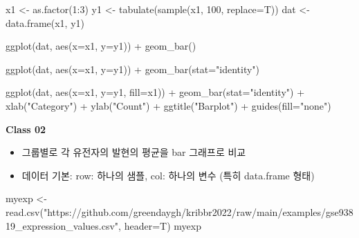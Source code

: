 \documentclass[
]{book}
\newenvironment{Shaded}{\begin{snugshade}}{\end{snugshade}}
\newcommand{\AttributeTok}[1]{\textcolor[rgb]{0.77,0.63,0.00}{#1}}
\newcommand{\DecValTok}[1]{\textcolor[rgb]{0.00,0.00,0.81}{#1}}
\newcommand{\FunctionTok}[1]{\textcolor[rgb]{0.00,0.00,0.00}{#1}}
\newcommand{\NormalTok}[1]{#1}
\newcommand{\OtherTok}[1]{\textcolor[rgb]{0.56,0.35,0.01}{#1}}
\newcommand{\SpecialCharTok}[1]{\textcolor[rgb]{0.00,0.00,0.00}{#1}}
\newcommand{\StringTok}[1]{\textcolor[rgb]{0.31,0.60,0.02}{#1}}
\providecommand{\tightlist}{%
  \setlength{\itemsep}{0pt}\setlength{\parskip}{0pt}}
\begin{document}
\begin{Shaded}
\begin{Highlighting}[]
\NormalTok{x1 }\OtherTok{\textless{}{-}} \FunctionTok{as.factor}\NormalTok{(}\DecValTok{1}\SpecialCharTok{:}\DecValTok{3}\NormalTok{)}
\NormalTok{y1 }\OtherTok{\textless{}{-}} \FunctionTok{tabulate}\NormalTok{(}\FunctionTok{sample}\NormalTok{(x1, }\DecValTok{100}\NormalTok{, }\AttributeTok{replace=}\NormalTok{T))}
\NormalTok{dat }\OtherTok{\textless{}{-}} \FunctionTok{data.frame}\NormalTok{(x1, y1)}

\FunctionTok{ggplot}\NormalTok{(dat, }\FunctionTok{aes}\NormalTok{(}\AttributeTok{x=}\NormalTok{x1, }\AttributeTok{y=}\NormalTok{y1)) }\SpecialCharTok{+}
  \FunctionTok{geom\_bar}\NormalTok{()}

\FunctionTok{ggplot}\NormalTok{(dat, }\FunctionTok{aes}\NormalTok{(}\AttributeTok{x=}\NormalTok{x1, }\AttributeTok{y=}\NormalTok{y1)) }\SpecialCharTok{+}
  \FunctionTok{geom\_bar}\NormalTok{(}\AttributeTok{stat=}\StringTok{"identity"}\NormalTok{)}

\FunctionTok{ggplot}\NormalTok{(dat, }\FunctionTok{aes}\NormalTok{(}\AttributeTok{x=}\NormalTok{x1, }\AttributeTok{y=}\NormalTok{y1, }\AttributeTok{fill=}\NormalTok{x1)) }\SpecialCharTok{+}
  \FunctionTok{geom\_bar}\NormalTok{(}\AttributeTok{stat=}\StringTok{"identity"}\NormalTok{) }\SpecialCharTok{+}
  \FunctionTok{xlab}\NormalTok{(}\StringTok{"Category"}\NormalTok{) }\SpecialCharTok{+}
  \FunctionTok{ylab}\NormalTok{(}\StringTok{"Count"}\NormalTok{) }\SpecialCharTok{+}
  \FunctionTok{ggtitle}\NormalTok{(}\StringTok{"Barplot"}\NormalTok{) }\SpecialCharTok{+}
  \FunctionTok{guides}\NormalTok{(}\AttributeTok{fill=}\StringTok{"none"}\NormalTok{)}
\end{Highlighting}
\end{Shaded}

\textbf{Class 02}

\begin{itemize}
\tightlist
\item
  그룹별로 각 유전자의 발현의 평균을 bar 그래프로 비교
\item
  데이터 기본: row: 하나의 샘플, col: 하나의 변수 (특히 data.frame 형태)
\end{itemize}

\begin{Shaded}
\begin{Highlighting}[]
\NormalTok{myexp }\OtherTok{\textless{}{-}} \FunctionTok{read.csv}\NormalTok{(}\StringTok{"https://github.com/greendaygh/kribbr2022/raw/main/examples/gse93819\_expression\_values.csv"}\NormalTok{, }\AttributeTok{header=}\NormalTok{T)}
\NormalTok{myexp}
\end{Highlighting}
\end{Shaded}
\end{document}
